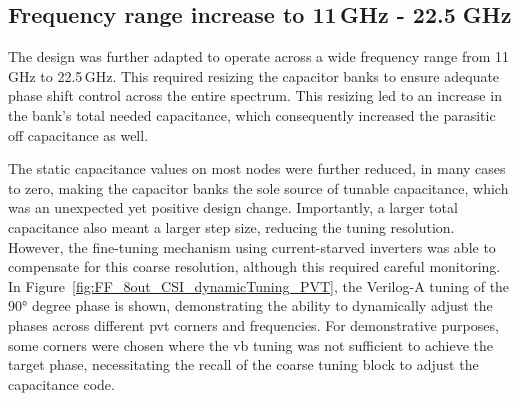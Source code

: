 \subsection{Frequency range increase to 11\,GHz - 22.5\,\,GHz}\label{sec:freq_range}

The design was further adapted to operate across a wide frequency range from 11\,GHz to 22.5\,GHz. This required resizing the capacitor banks to ensure adequate phase shift control across the entire spectrum. This resizing led to an increase in the bank's total needed capacitance, which consequently increased the parasitic off capacitance as well.

The static capacitance values on most nodes were further reduced, in many cases to zero, making the capacitor banks the sole source of tunable capacitance, which was an unexpected yet positive design change. Importantly, a larger total capacitance also meant a larger step size, reducing the tuning resolution. However, the fine-tuning mechanism using current-starved inverters was able to compensate for this coarse resolution, although this required careful monitoring. In Figure~\ref{fig:FF_8out_CSI_dynamicTuning_PVT}, the Verilog-A tuning of the \ang{90} degree phase is shown, demonstrating the ability to dynamically adjust the phases across different \gls{pvt} corners and frequencies. For demonstrative purposes, some corners were chosen where the vb tuning was not sufficient to achieve the target phase, necessitating the recall of the coarse tuning block to adjust the capacitance code.

